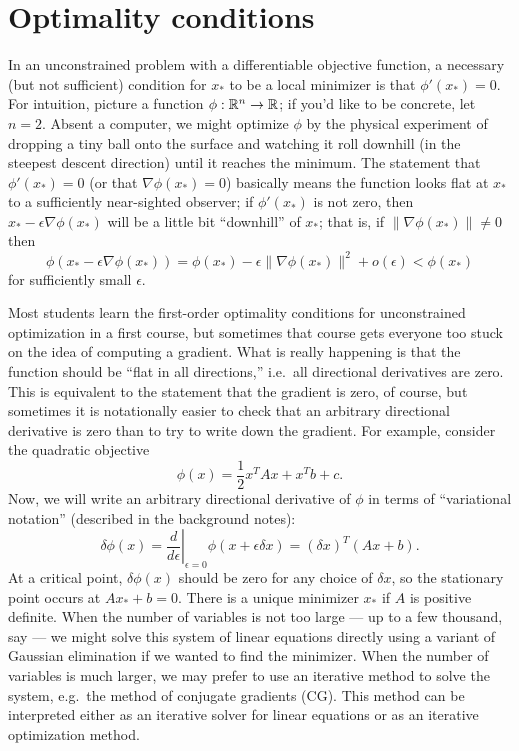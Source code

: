 \documentclass[12pt, leqno]{article} %
\begin{document}

\section{Optimality conditions}

In an unconstrained problem with a differentiable objective
function, a necessary (but not sufficient) condition for $x_*$
to be a local minimizer is that $\phi'(x_*) = 0$.
For intuition, picture a function $\phi : \mathbb{R}^n \rightarrow \mathbb{R}$; if
you'd like to be concrete, let $n = 2$.  Absent a computer, we might
optimize $\phi$ by the physical experiment of dropping a tiny ball
onto the surface and watching it roll downhill (in the steepest
descent direction) until it reaches the minimum.  The statement
that $\phi'(x_*) = 0$ (or that $\nabla \phi(x_*) = 0$) basically means
the function looks flat at $x_*$ to a sufficiently near-sighted observer;
if $\phi'(x_*)$ is not zero, then $x_* - \epsilon \nabla \phi(x_*)$
will be a little bit ``downhill'' of $x_*$; that is,
if $\|\nabla \phi(x_*)\| \neq 0$ then
\[
  \phi(x_* - \epsilon \nabla \phi(x_*)) =
  \phi(x_*) - \epsilon \|\nabla \phi(x_*)\|^2 + o(\epsilon) < \phi(x_*)
\]
for sufficiently small $\epsilon$.

Most students learn the first-order optimality conditions for unconstrained
optimization in a first course, but sometimes that course gets
everyone too stuck on the idea of computing a gradient.  What is
really happening is that the function should be ``flat in all directions,''
i.e.~all directional derivatives are zero.  This is equivalent to the
statement that the gradient is zero, of course, but sometimes it is
notationally easier to check that an arbitrary directional derivative
is zero than to try to write down the gradient.  For example, consider
the quadratic objective
\[
  \phi(x) = \frac{1}{2} x^T A x + x^T b + c.
\]
Now, we will write an arbitrary directional derivative of $\phi$ in
terms of ``variational notation'' (described in the background notes):
\[
\delta \phi(x) =
\left. \frac{d}{d\epsilon} \right|_{\epsilon = 0} \phi(x+ \epsilon \delta x)
= (\delta x)^T (Ax + b).
\]
At a critical point, $\delta \phi(x)$ should be zero for any
choice of $\delta x$, so the stationary point occurs at $Ax_* + b = 0$.
There is a unique minimizer $x_*$ if $A$ is positive definite.
When the number of variables is not too large --- up to a few
thousand, say --- we might solve this system of linear equations
directly using a variant of Gaussian elimination
if we wanted to find the minimizer.  When the number of variables
is much larger, we may prefer to use an iterative method 
to solve the system, e.g.~the method of conjugate gradients (CG).
This method can be interpreted either as an iterative solver for
linear equations or as an iterative optimization method.
\end{document}
